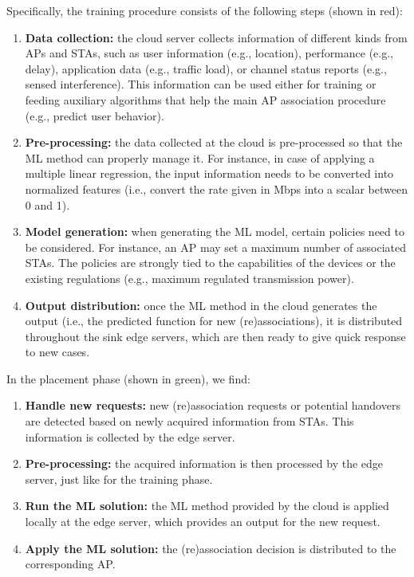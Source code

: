 \documentclass{article}
\begin{document}
Specifically, the training procedure consists of the following steps (shown in red):
\begin{enumerate}
	\item \textbf{Data collection:} the cloud server collects information of different kinds from APs and STAs, such as user information (e.g., location), performance (e.g., delay), application data (e.g., traffic load), or channel status reports (e.g., sensed interference). This information can be used either for training or feeding auxiliary algorithms that help the main AP association procedure (e.g., predict user behavior).
	\item \textbf{Pre-processing:} the data collected at the cloud is pre-processed so that the ML method can properly manage it. For instance, in case of applying a multiple linear regression, the input information needs to be converted into normalized features (i.e., convert the rate given in Mbps into a scalar between 0 and 1).
	\item \textbf{Model generation:} when generating the ML model, certain policies need to be considered. For instance, an AP may set a maximum number of associated STAs. The policies are strongly tied to the capabilities of the devices or the existing regulations (e.g., maximum regulated transmission power).
	\item \textbf{Output distribution:} once the ML method in the cloud generates the output (i.e., the predicted function for new (re)associations), it is distributed throughout the sink edge servers, which are then ready to give quick response to new cases.
\end{enumerate}

In the placement phase (shown in green), we find:
\begin{enumerate}
	\item \textbf{Handle new requests:} new (re)association requests or potential handovers are detected based on newly acquired information from STAs. This information is collected by the edge server.
	\item \textbf{Pre-processing:} the acquired information is then processed by the edge server, just like for the training phase.
	\item \textbf{Run the ML solution:} the ML method provided by the cloud is applied locally at the edge server, which provides an output for the new request.
	\item \textbf{Apply the ML solution:} the (re)association decision is distributed to the corresponding AP.
\end{enumerate}
\end{document}

